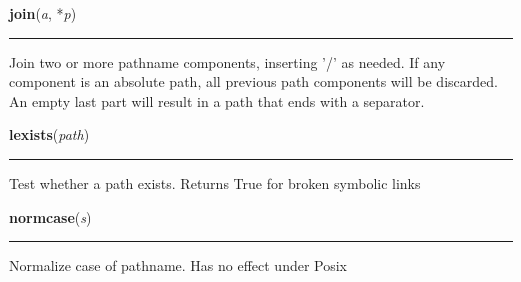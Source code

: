     \vspace{0.5ex}

\hspace{.8\funcindent}\begin{boxedminipage}{\funcwidth}

    \raggedright \textbf{join}(\textit{a}, *\textit{p})

    \vspace{-1.5ex}

    \rule{\textwidth}{0.5\fboxrule}
\setlength{\parskip}{2ex}
    Join two or more pathname components, inserting '/' as needed. If any 
    component is an absolute path, all previous path components will be 
    discarded.  An empty last part will result in a path that ends with a 
    separator.

\setlength{\parskip}{1ex}
    \end{boxedminipage}

    \label{posixpath:lexists}

    \vspace{0.5ex}

\hspace{.8\funcindent}\begin{boxedminipage}{\funcwidth}

    \raggedright \textbf{lexists}(\textit{path})

    \vspace{-1.5ex}

    \rule{\textwidth}{0.5\fboxrule}
\setlength{\parskip}{2ex}
    Test whether a path exists.  Returns True for broken symbolic links

\setlength{\parskip}{1ex}
    \end{boxedminipage}

    \label{posixpath:normcase}

    \vspace{0.5ex}

\hspace{.8\funcindent}\begin{boxedminipage}{\funcwidth}

    \raggedright \textbf{normcase}(\textit{s})

    \vspace{-1.5ex}

    \rule{\textwidth}{0.5\fboxrule}
\setlength{\parskip}{2ex}
    Normalize case of pathname.  Has no effect under Posix

\setlength{\parskip}{1ex}
    \end{boxedminipage}

